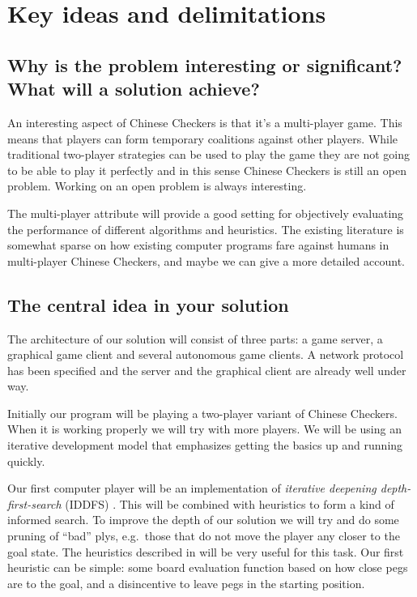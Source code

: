 \documentclass[a4paper,11pt]{article}
\begin{document}
\section{Key ideas and delimitations}
\subsection{Why is the problem interesting or significant?  What will a solution achieve?}

An interesting aspect of Chinese Checkers is that it's a multi-player
game. This means that players can form temporary coalitions against
other players. While traditional two-player strategies can be used to
play the game they are not going to be able to play it perfectly and
in this sense Chinese Checkers is still an open problem. Working on an
open problem is always interesting.

The multi-player attribute will provide a good setting for objectively
evaluating the performance of different algorithms and heuristics. The
existing literature is somewhat sparse on how existing computer
programs fare against humans in multi-player Chinese Checkers, and
maybe we can give a more detailed account.

\subsection{The central idea in your solution}

The architecture of our solution will consist of three parts: a game
server, a graphical game client and several autonomous game clients. A
network protocol has been specified and the server and the graphical
client are already well under way.

Initially our program will be playing a two-player variant of Chinese
Checkers. When it is working properly we will try with more players.
We will be using an iterative development model that emphasizes
getting the basics up and running quickly.

Our first computer player will be an implementation of \emph{iterative
  deepening depth-first-search} (IDDFS) \cite{aimodern}. This will be
combined with heuristics to form a kind of informed search. To improve
the depth of our solution we will try and do some pruning of ``bad''
plys, e.g.~those that do not move the player any closer to the goal
state. The heuristics described in \cite{ulfhake} will be very useful
for this task. Our first heuristic can be simple: some board
evaluation function based on how close pegs are to the goal, and a
disincentive to leave pegs in the starting position.
\end{document}
